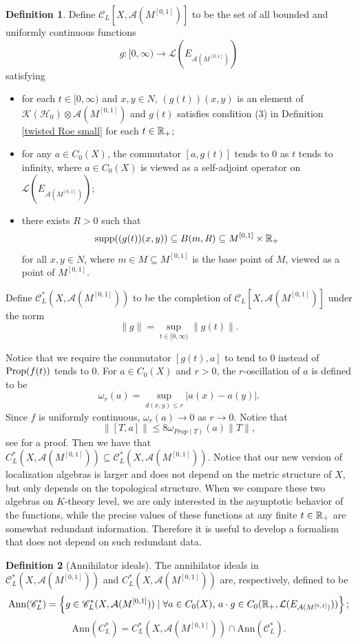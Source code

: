 \documentclass[11pt]{article}
\theoremstyle{definition}
\newtheorem{Def}{Definition}[section]
\theoremstyle{plain}
\def\A{\mathcal A}\def\C{\mathcal C}\def\B{\mathcal B}\def\E{\mathcal E}\def\O{\mathcal O}\def\h{\mathfrak h}\def\K{\mathcal K}\def\F{\mathcal F}\def\P{\mathcal P}\def\L{\mathcal L}\def\R{\mathcal R}\def\Q{\mathcal Q}\def\H{\mathcal H}\def\S{\mathcal S}\def\N{\mathcal N}\def\U{\mathcal U}\def\V{\mathcal V}
\def\sC{\mathscr C}
\def\supp{\textup{supp}}
\def\prop{\textup{Prop}}
\def\ox{\otimes}
\def\ox{\otimes}
\begin{document}
\begin{appendices}
\begin{Def}\label{commutator}
Define $\sC_L[X,\A(M^{[0,1]})]$ to be the set of all bounded and uniformly continuous functions
$$g:[0,\infty)\to\L(E_{\A(M^{[0,1]})})$$
satisfying\begin{itemize}
\item[(1)] for each $t\in[0,\infty)$ and $x,y\in N$, $(g(t))(x,y)$ is an element of $\K(\H_0)\ox\A(M^{[0,1]})$ and $g(t)$ satisfies condition (3) in Definition \ref{twisted Roe small} for each $t\in\mathbb R_+$;
\item[(2)] for any $a\in C_0(X)$, the commutator $[a,g(t)]$ tends to $0$ as $t$ tends to infinity, where $a\in C_0(X)$ is viewed as a self-adjoint operator on $\L(E_{\A(M^{[0,1]})})$;
\item[(3)] there exists $R>0$ such that
$$\supp((g(t))(x,y))\subseteq B(m,R)\subseteq M^{[0,1]}\times\IR_+$$
for all $x,y\in N$, where $m\in M\subseteq M^{[0,1]}$ is the base point of $M$, viewed as a point of $M^{[0,1]}$.
\end{itemize}
Define $\sC^*_L(X,\A(M^{[0,1]}))$ to be the completion of $\sC_L[X,\A(M^{[0,1]})]$ under the norm
$$\|g\|=\sup_{t\in[0,\infty)}\|g(t)\|.$$
\end{Def}

Notice that we require the commutator $[g(t), a]$ to tend to $0$ instead of $\prop(f(t))$ tends to $0$. For $a\in C_0(X)$ and $r>0$, the $r$-oscillation of $a$ is defined to be
$$\omega_r(a)=\sup_{d(x,y)\leq r}|a(x)-a(y)|.$$
Since $f$ is uniformly continuous, $\omega_r(a)\to 0$ as $r\to 0$. Notice that
\begin{equation}\label{commutator}\|[T,a]\|\leq 8\omega_{Prop(T)}(a)\|T\|,\end{equation}
see \cite[Lemma 6.12]{HIT2020} for a proof. Then we have that $C^*_L(X,\A(M^{[0,1]}))\subseteq \sC^*_L(X,\A(M^{[0,1]}))$. Notice that our new version of localization algebras is larger and does not depend on the metric structure of $X$, but only depends on the topological structure. When we compare these two algebras on $K$-theory level, we are only interested in the asymptotic behavior of the functions, while the precise values of these functions at any finite $t\in\mathbb R_+$ are somewhat redundant information. Therefore it is useful to develop a formalism that does not depend on such redundant data.

\begin{Def}[Annihilator ideals]
The annihilator ideals in $\sC^*_L(X,\A(M^{[0,1]}))$ and $C^*_L(X,\A(M^{[0,1]}))$ are, respectively, defined to be
$$\mathrm{Ann}(\sC^*_L)=\left\{g\in\sC^*_L(X,\A(M^{[0,1]}))\mid \forall a\in C_0(X),\, a\cdot g\in C_0(\IR_+,\L(E_{\A(M^{[0,1]})}))\right\};$$
$$\mathrm{Ann}(C^*_L)=C^*_L(X,\A(M^{[0,1]}))\cap \mathrm{Ann}(\sC^*_L).$$
\end{Def}


\end{appendices}
\end{document}
